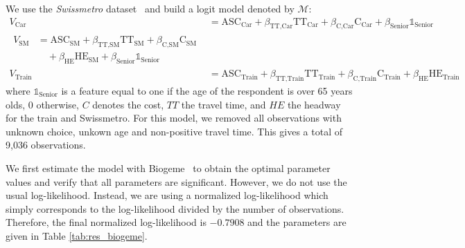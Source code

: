 \documentclass[conference]{IEEEtran}
\begin{document}
We use the {\it Swissmetro} dataset~\cite{bierlaire_acceptance_2001} and build a logit model denoted by $\mathcal{M}$:
\begin{align}
\label{eq:model}
V_{\text{Car}} &= \text{ASC}_{\text{Car}} + \beta_{\text{TT,Car}} \text{TT}_{\text{Car}} + \beta_{\text{C,Car}} \text{C}_{\text{Car}} + \beta_{\text{Senior}}\mathbb{1}_{\text{Senior}} \nonumber \\
\begin{split}
V_{\text{SM}} &= \text{ASC}_{\text{SM}} + \beta_{\text{TT,SM}} \text{TT}_{\text{SM}} + \beta_{\text{C,SM}} \text{C}_{\text{SM}} \\
& \quad + \beta_{\text{HE}} \text{HE}_{\text{SM}} + \beta_{\text{Senior}}\mathbb{1}_{\text{Senior}}
\end{split} \\
V_{\text{Train}} &= \text{ASC}_{\text{Train}} + \beta_{\text{TT,Train}} \text{TT}_{\text{Train}} + \beta_{\text{C,Train}} \text{C}_{\text{Train}} + \beta_{\text{HE}} \text{HE}_{\text{Train}} \nonumber
\end{align}
where $\mathbb{1}_{\text{Senior}}$ is a feature equal to one if the age of the respondent is over 65 years olds, 0 otherwise, $C$ denotes the cost, $TT$ the travel time, and $HE$ the headway for the train and Swissmetro. For this model, we removed all observations with unknown choice, unkown age and non-positive travel time. This gives a total of 9,036 observations.
 
We first estimate the model with Biogeme~\cite{bierlaire_biogeme:_2003} to obtain the optimal parameter values and verify that all parameters are significant. However, we do not use the usual log-likelihood. Instead, we are using a normalized log-likelihood which simply corresponds to the log-likelihood divided by the number of observations. Therefore, the final normalized log-likelihood is $-0.7908$ and the parameters are given in Table \ref{tab:res_biogeme}.
\end{document}

